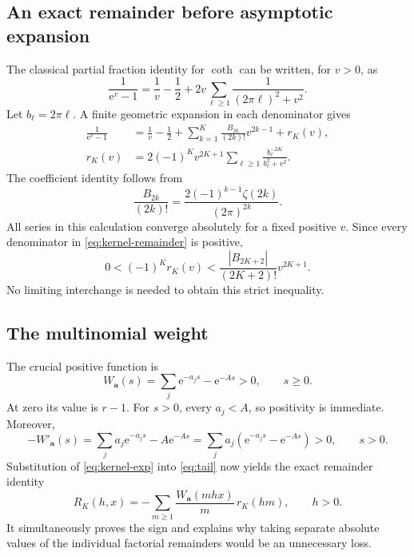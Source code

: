 \documentclass[11pt,a4paper]{article}
\numberwithin{equation}{section}
\theoremstyle{definition}\newtheorem{definition}[theorem]{Definition}
\theoremstyle{remark}\newtheorem{remark}[theorem]{Remark}
\newcommand{\e}{\mathrm e}
\newcommand{\avec}{\boldsymbol a}
\begin{document}
\subsection{An exact remainder before asymptotic expansion}
The classical partial fraction identity for $\coth$ \cite{dlmf-hyperbolic}
can be written, for $v>0$, as
\begin{equation}
 \frac1{\e^v-1}=\frac1v-\frac12
              +2v\sum_{\ell\ge1}\frac1{(2\pi\ell)^2+v^2}.
 \label{eq:bose-pf}
\end{equation}
Let $b_\ell=2\pi\ell$. A finite geometric expansion in each denominator gives
\begin{align}
 \frac1{\e^v-1}
 &=\frac1v-\frac12+
   \sum_{k=1}^K\frac{B_{2k}}{(2k)!}v^{2k-1}+r_K(v),\label{eq:kernel-exp}\\
 r_K(v)&=2(-1)^K v^{2K+1}
        \sum_{\ell\ge1}\frac{b_\ell^{-2K}}{b_\ell^2+v^2}.
 \label{eq:kernel-remainder}
\end{align}
The coefficient identity follows from
\begin{equation}
 \frac{B_{2k}}{(2k)!}
   =\frac{2(-1)^{k-1}\zeta(2k)}{(2\pi)^{2k}}.
 \label{eq:bernoulli-zeta}
\end{equation}
All series in this calculation converge absolutely for a fixed positive $v$.
Since every denominator in \eqref{eq:kernel-remainder} is positive,
\begin{equation}
 0<(-1)^K r_K(v)
 <\frac{|B_{2K+2}|}{(2K+2)!}v^{2K+1}.
 \label{eq:kernel-signed}
\end{equation}
No limiting interchange is needed to obtain this strict inequality.

\subsection{The multinomial weight}
The crucial positive function is
\begin{equation}
 W_{\avec}(s)=\sum_j\e^{-a_js}-\e^{-As}>0,
 \qquad s\ge0.
 \label{eq:W}
\end{equation}
At zero its value is $r-1$. For $s>0$, every $a_j<A$, so positivity is immediate.
Moreover,
\begin{equation}
 -W'_{\avec}(s)=\sum_j a_j\e^{-a_js}-A\e^{-As}
              =\sum_j a_j(\e^{-a_js}-\e^{-As})>0,\qquad s>0.
 \label{eq:W-derivative}
\end{equation}
Substitution of \eqref{eq:kernel-exp} into \eqref{eq:tail} now yields the exact
remainder identity
\begin{equation}
 R_K(h,x)=-\sum_{m\ge1}\frac{W_{\avec}(mhx)}{m}\,r_K(hm),
 \qquad h>0.
 \label{eq:Rexact}
\end{equation}
It simultaneously proves the sign and explains why taking separate absolute
values of the individual factorial remainders would be an unnecessary loss.
\end{document}
